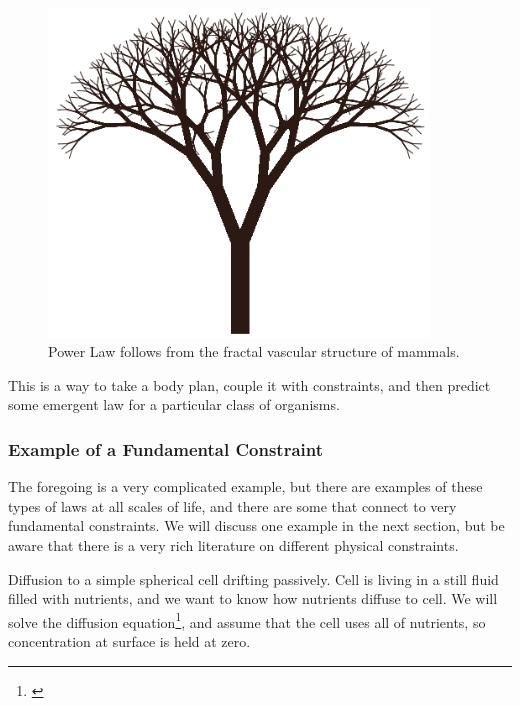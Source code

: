 \documentclass[]{article}
\begin{document}
\begin{figure}[H]
	\caption{Power Law follows from the fractal vascular structure of mammals.}\label{fig:FractalBranching}
	\includegraphics[width=0.9\textwidth]{FractalBranching}
\end{figure}

This is a  way to take a body plan, couple it with constraints, and then predict some emergent law for a particular class of organisms.

\subsubsection{Example of a Fundamental Constraint}

The foregoing is a very complicated example, but there are examples of these types of laws at all scales of life, and there are some that connect to very fundamental constraints. We will discuss one example in the next section, but be aware that there is a very rich literature on different physical constraints.

Diffusion to a simple spherical cell drifting passively. Cell is living in a still fluid filled with nutrients, and we want to know how nutrients diffuse to cell. We will solve the diffusion equation\footnote{\cite[Lecture 3.8: Systematics and Limits of Metabolic Rates]{sfi2020}}, and assume that the cell uses all of nutrients, so concentration at surface is held at zero.
\end{document}
